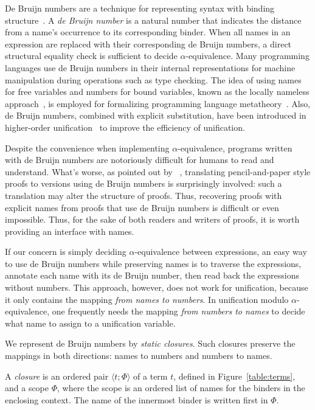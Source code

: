 \documentclass[a4paper,UKenglish]{lipics-v2016}
\newcommand{\clos}[2] {
\langle #1; #2 \rangle
}
\begin{document}
De Bruijn numbers are a technique for representing syntax with binding
structure~\citep{de_bruijn_lambda_1972}. A \emph{de Bruijn number} is
a natural number that indicates the distance from a name's occurrence
to its corresponding binder. When all names in an expression are
replaced with their corresponding de Bruijn numbers, a direct
structural equality check is sufficient to decide
$\alpha$-equivalence. Many programming languages use de Bruijn numbers
in their internal representations for machine manipulation during
operations such as type checking. The idea of using names for free
variables and numbers for bound variables, known as the locally
nameless approach~\citep{chargueraud_locally_2012}, is employed for
formalizing programming language metatheory~\citep{aydemir_nominal_2006,
aydemir_engineering_2008}. Also, de Bruijn numbers, combined with
explicit substitution, have been introduced in higher-order
unification~\citep{dowek_higher_2000} to improve the efficiency of
unification.

Despite the convenience when implementing $\alpha$-equivalence,
programs written with de Bruijn numbers are notoriously difficult for
humans to read and understand. What's worse, as pointed out by
~\citet{berghofer_head--head_2007}, translating
pencil-and-paper style proofs to versions using de Bruijn numbers is
surprisingly involved: such a translation may alter the structure of
proofs. Thus, recovering proofs with explicit names from proofs that use de
Bruijn numbers is difficult or even impossible. Thus, for the sake of
both readers and writers of proofs, it is worth providing an interface
with names.

If our concern is simply deciding $\alpha$-equivalence between
expressions, an easy way to use de Bruijn numbers while preserving
names is to traverse the expressions, annotate each name with its de
Bruijn number, then read back the expressions without numbers. This
approach, however, does not work for unification, because it only
contains the mapping \emph{from names to numbers}. In unification
modulo $\alpha$-equivalence, one frequently needs the mapping
\emph{from numbers to names} to decide what name to assign to a
unification variable.

We represent de Bruijn numbers by \emph{static closures}.
Such closures preserve the
mappings in both directions: names to numbers and numbers to names.

\begin{definition}
A \emph{closure} is an ordered pair $\clos{t}{\Phi}$ of a term $t$,
defined in Figure~\ref{table:terms}, and a scope $\Phi$, where the
scope is an ordered list of names for the binders in the enclosing
context. The name of the innermost binder is written first in $\Phi$.
\end{definition}
\end{document}
